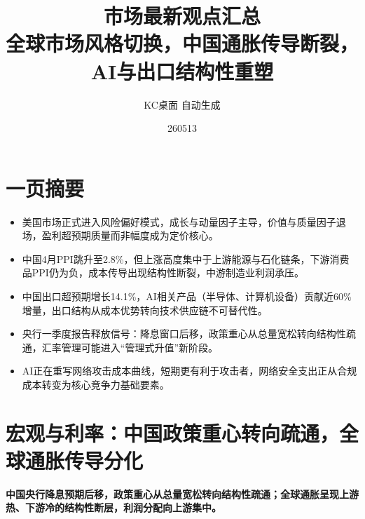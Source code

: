 \documentclass[11pt]{ctexart}
\title{\textbf{市场最新观点汇总}\\[0.4em]{\large 全球市场风格切换，中国通胀传导断裂，AI与出口结构性重塑}}
\author{KC桌面 自动生成}
\date{260513}
\begin{document}
\maketitle
\section*{一页摘要}
\begin{itemize}
  \item 美国市场正式进入风险偏好模式，成长与动量因子主导，价值与质量因子退场，盈利超预期质量而非幅度成为定价核心。
  \item 中国4月PPI跳升至2.8\%，但上涨高度集中于上游能源与石化链条，下游消费品PPI仍为负，成本传导出现结构性断裂，中游制造业利润承压。
  \item 中国出口超预期增长14.1\%，AI相关产品（半导体、计算机设备）贡献近60\%增量，出口结构从成本优势转向技术供应链不可替代性。
  \item 央行一季度报告释放信号：降息窗口后移，政策重心从总量宽松转向结构性疏通，汇率管理可能进入“管理式升值”新阶段。
  \item AI正在重写网络攻击成本曲线，短期更有利于攻击者，网络安全支出正从合规成本转变为核心竞争力基础要素。
\end{itemize}
\section{宏观与利率：中国政策重心转向疏通，全球通胀传导分化}
\textbf{中国央行降息预期后移，政策重心从总量宽松转向结构性疏通；全球通胀呈现上游热、下游冷的结构性断层，利润分配向上游集中。}
\end{document}
